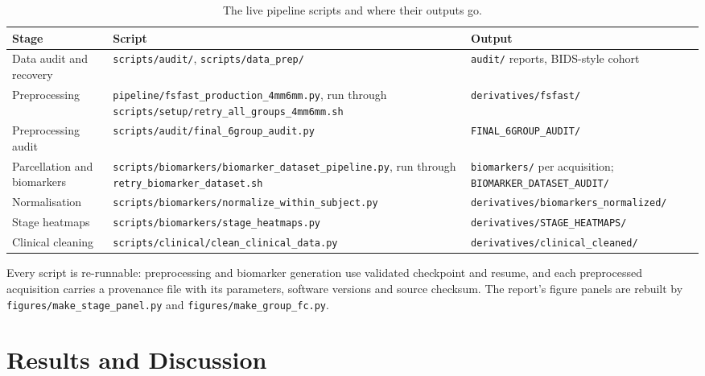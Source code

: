\documentclass{ssnreview}
\begin{document}
\begin{table}[!htbp]
\centering
\caption{The live pipeline scripts and where their outputs go.}
\label{tab:repro}
\footnotesize
\begin{tabularx}{\textwidth}{@{}>{\raggedright\arraybackslash}p{3.0cm}>{\raggedright\arraybackslash}p{5.6cm}X@{}}
\toprule
\textbf{Stage} & \textbf{Script} & \textbf{Output} \\
\midrule
Data audit and recovery & \texttt{scripts/\allowbreak audit/}, \texttt{scripts/\allowbreak data\_prep/} & \texttt{audit/} reports, BIDS-style cohort \\
Preprocessing & \texttt{pipeline/\allowbreak fsfast\_production\_4mm6mm.py}, run through \texttt{scripts/\allowbreak setup/\allowbreak retry\_all\_groups\_4mm6mm.sh} & \texttt{derivatives/\allowbreak fsfast/} \\
Preprocessing audit & \texttt{scripts/\allowbreak audit/\allowbreak final\_6group\_audit.py} & \texttt{FINAL\_6GROUP\_AUDIT/} \\
Parcellation and biomarkers & \texttt{scripts/\allowbreak biomarkers/\allowbreak biomarker\_dataset\_pipeline.py}, run through \texttt{retry\_biomarker\_dataset.sh} & \texttt{biomarkers/} per acquisition; \texttt{BIOMARKER\_DATASET\_AUDIT/} \\
Normalisation & \texttt{scripts/\allowbreak biomarkers/\allowbreak normalize\_within\_subject.py} & \texttt{derivatives/\allowbreak biomarkers\_normalized/} \\
Stage heatmaps & \texttt{scripts/\allowbreak biomarkers/\allowbreak stage\_heatmaps.py} & \texttt{derivatives/\allowbreak STAGE\_HEATMAPS/} \\
Clinical cleaning & \texttt{scripts/\allowbreak clinical/\allowbreak clean\_clinical\_data.py} & \texttt{derivatives/\allowbreak clinical\_cleaned/} \\
\bottomrule
\end{tabularx}
\end{table}

Every script is re-runnable: preprocessing and biomarker generation use validated checkpoint
and resume, and each preprocessed acquisition carries a provenance file with its parameters,
software versions and source checksum. The report's figure panels are rebuilt by
\texttt{figures/make\_stage\_panel.py} and \texttt{figures/make\_group\_fc.py}.

\chapter{Results and Discussion}
\end{document}
